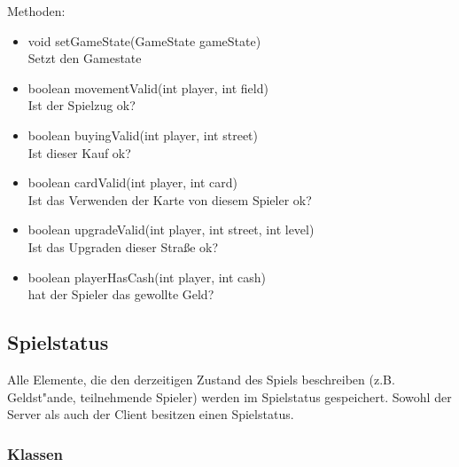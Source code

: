 \documentclass[a4paper,10pt]{article}
\begin{document}
\begin{itemize}
Methoden:
\begin{itemize}
\item void setGameState(GameState gameState)
\\Setzt den Gamestate
\item boolean movementValid(int player, int field)
\\Ist der Spielzug ok?
\item boolean buyingValid(int player, int street)
\\Ist dieser Kauf ok?
\item boolean cardValid(int player, int card)
\\Ist das Verwenden der Karte von diesem Spieler ok?
\item boolean upgradeValid(int player, int street, int level)
\\Ist das Upgraden dieser Straße ok?
\item boolean playerHasCash(int player, int cash)
\\hat der Spieler das gewollte Geld?
\end{itemize} %
\end{itemize} %

\subsection{Spielstatus}


Alle Elemente, die den derzeitigen Zustand des Spiels beschreiben (z.B. Geldst"ande, teilnehmende Spieler) werden im Spielstatus gespeichert. Sowohl der Server als auch der Client besitzen einen Spielstatus.

\subsubsection{Klassen}
\end{document}
